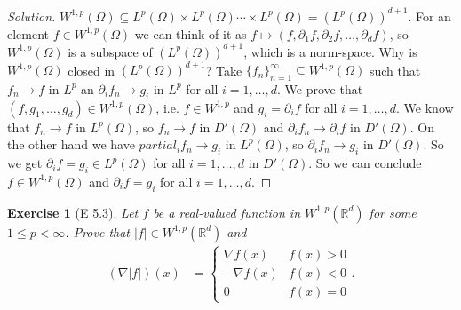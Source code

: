 \documentclass{report}
\theoremstyle{tommy}
\newtheorem{ex}[defn]{Exercise}
\begin{document}
  \begin{proof}[Solution]
    \(W^{1,p}(\Omega) \subseteq L^p(\Omega) \times L^p(\Omega) \cdots \times L^p(\Omega) = (L^p(\Omega))^{d+1}\). For an element \(f \in W^{1,p}(\Omega)\) we can think of it as \(f \mapsto (f, \partial_1 f, \partial_2 f, \dots, \partial_d f)\), so \(W^{1,p}(\Omega)\)  is a subspace of \((L^p(\Omega))^{d+1}\), which is a norm-space. Why is \(W^{1,p}(\Omega)\) closed in \((L^p(\Omega))^{d+1}\)? Take \(\{f_n\}_{n=1}^\infty \subseteq W^{1,p}(\Omega)\) such that \(f_n \to f\) in \(L^p\) an \(\partial_i f_n \to g_i\) in \(L^p\) for all \(i = 1, \dots, d\). We prove that \((f, g_1, \dots, g_d) \in W^{1,p}(\Omega)\), i.e. \(f \in W^{1,p}\) and \(g_i = \partial_i f\) for all \(i = 1, \dots, d\). We know that \(f_n \to f\) in \(L^p(\Omega)\), so \(f_n \to f\) in \(D'(\Omega)\) and \(\partial_i f_n \to \partial_i f\) in \(D'(\Omega)\). On the other hand we have \(partial_i f_n \to g_i\) in \(L^p(\Omega)\), so \(\partial_i f_n \to g_i\) in \(D'(\Omega)\). So we get \(\partial_i f = g_i \in L^p(\Omega)\) for all \(i=1, \dots, d\) in \(D'(\Omega)\). So we can conclude \(f \in W^{1,p}(\Omega)\) and \(\partial_i f = g_i\) for all \(i = 1, \dots, d\).
  \end{proof}

  \begin{ex}[E 5.3]
    Let \(f\) be a real-valued function in \(W^{1,p}(\mathbb{R}^d)\) for some \(1 \le p < \infty\). Prove that \(|f| \in W^{1,p}(\mathbb{R}^d)\) and 
    \begin{align*}
      (\nabla |f|)(x) &= \begin{cases}
        \nabla f(x) & f(x) > 0 \\ - \nabla f(x) & f(x) < 0 \\ 0 & f(x) = 0
      \end{cases}.
    \end{align*}
  \end{ex}
\end{document}
